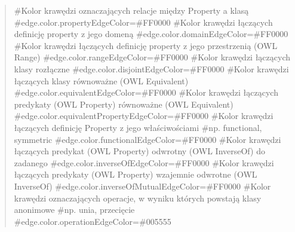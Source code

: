 \begin{quote}
\#Kolor krawędzi oznaczających relacje między Property a klasą \newline
\#edge.color.propertyEdgeColor=\#FF0000 \newline
 \newline
\#Kolor krawędzi łączących definicję property z jego domeną \newline
\#edge.color.domainEdgeColor=\#FF0000 \newline
 \newline
\#Kolor krawędzi łączących definicję property z jego przestrzenią (OWL Range) \newline
\#edge.color.rangeEdgeColor=\#FF0000 \newline
 \newline
\#Kolor krawędzi łączących klasy rozłączne \newline
\#edge.color.disjointEdgeColor=\#FF0000 \newline
 \newline
\#Kolor krawędzi łączących klasy równoważne (OWL Equivalent) \newline
\#edge.color.equivalentEdgeColor=\#FF0000 \newline
 \newline
\#Kolor krawędzi łączących predykaty (OWL Property) równoważne (OWL Equivalent) \newline
\#edge.color.equivalentPropertyEdgeColor=\#FF0000 \newline
 \newline
\#Kolor krawędzi łączących definicję Property z jego właściwościami \newline
\#np. functional, symmetric \newline
\#edge.color.functionalEdgeColor=\#FF0000 \newline
 \newline
\#Kolor krawędzi łączących predykat (OWL Property) odwrotny (OWL InverseOf) do zadanego \newline
\#edge.color.inverseOfEdgeColor=\#FF0000 \newline
 \newline
\#Kolor krawędzi łączących predykaty (OWL Property) wzajemnie odwrotne (OWL InverseOf) \newline
\#edge.color.inverseOfMutualEdgeColor=\#FF0000 \newline
 \newline
\#Kolor krawędzi oznaczających operacje, w wyniku których powstają klasy anonimowe \newline
\#np. unia, przecięcie \newline
\#edge.color.operationEdgeColor=\#005555 \newline
\end{quote}


